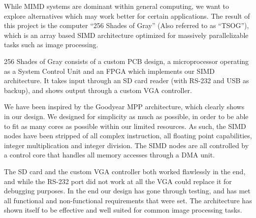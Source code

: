While MIMD systems are dominant within general computing, we want to explore
alternatives which may work better for certain applications. The result of this
project is the computer ``256 Shades of Gray'' (Also referred to as
``TSOG''), which is
an array based SIMD architecture optimized for massively parallelizable tasks
such as image processing.

256 Shades of Gray consists of a custom PCB design, a microprocessor operating
as a System Control Unit and an FPGA which implements our SIMD architecture. It
takes input through an SD card reader (with RS-232 and USB as
backup), and shows output
through a custom VGA controller.

We have been inspired by the Goodyear MPP architecture, which clearly shows in
our design. We designed for simplicity as much as possible, in
order to be able to fit as many cores as possible within our limited
resources. As such, the SIMD nodes have been stripped of all complex
instruction, all floating point capabilities, integer multiplication and integer
division. The SIMD nodes are all controlled by a control core that handles all
memory accesses through a DMA unit.

The SD card and the custom VGA controller both worked flawlessly in the
end, and while the RS-232 port did not work at
all the VGA could replace it for debugging purposes. In the end our design has
gone through testing, and has met all functional and non-functional requirements
that were set. The architecture has shown itself to be effective and well suited
for common image processing tasks.
\endgroup
